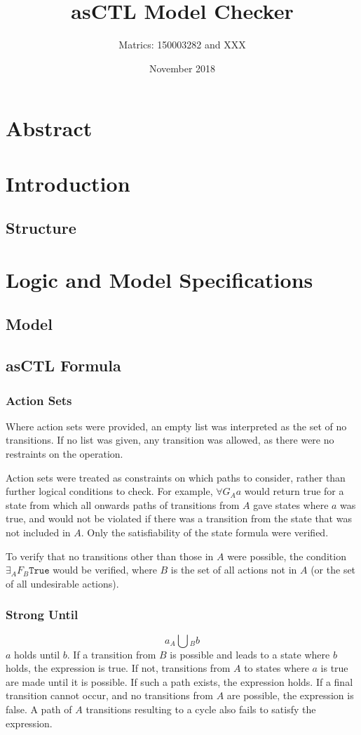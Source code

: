 \documentclass[a4paper,11pt]{article}
\title{asCTL Model Checker}
\author{Matrics: 150003282 and XXX}
\date{November 2018}
\begin{document}
	
	\maketitle
	\section*{Abstract}
	
	\pagebreak
	\section{Introduction}
	\subsection{Structure}
	
	\section{Logic and Model Specifications}
	\subsection{Model}
	\subsection{asCTL Formula}
	\subsubsection{Action Sets}
	Where action sets were provided, an empty list was interpreted as the set of no transitions. If no list was given, any transition was allowed, as there were no restraints on the operation.
	
	Action sets were treated as constraints on which paths to consider, rather than further logical conditions to check. For example, $\forall G{_Aa}$ would return true for a state from which all onwards paths of transitions from $A$ gave states where $a$ was true, and would not be violated if there was a transition from the state that was not included in $A$. Only the satisfiability of the state formula were verified.
	
	To verify that no transitions other than those in $A$ were possible, the condition $\exists _A F{_B}\texttt{True}$ would be verified, where $B$ is the set of all actions not in $A$ (or the set of all undesirable actions). 
	
	\subsubsection{Strong Until}
	$$a _A\bigcup{_B b} $$
	$a$ holds until $b$. If a transition from $B$ is possible and leads to a state where $b$ holds, the expression is true. If not, transitions from $A$ to states where $a$ is true are made until it is possible. If such a path exists, the expression holds. If a final transition cannot occur, and no transitions from $A$ are possible, the expression is false. A path of $A$ transitions resulting to a cycle also fails to satisfy the expression.
	
\end{document}

